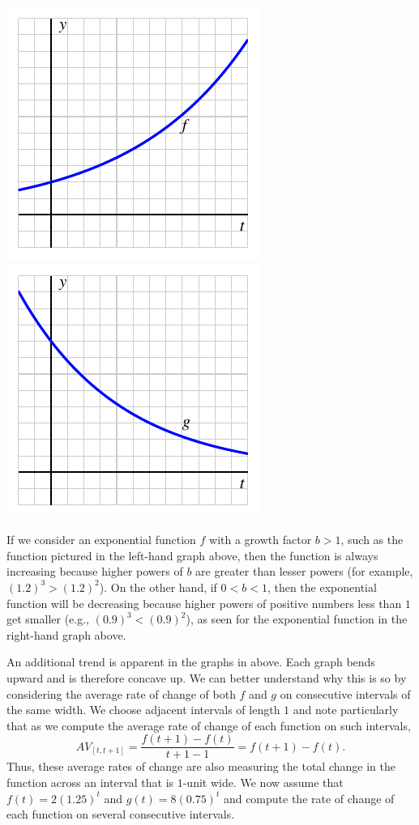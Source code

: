 \documentclass[nooutcomes]{ximera}
\begin{document}
\begin{image}
\includegraphics{growth-incr-CCU}
\includegraphics{growth-decr-CCU}
\end{image}

If we consider an exponential function $f$ with a growth factor $b > 1$, such as the function pictured in the left-hand graph above, then the function is always increasing because higher powers of $b$ are greater than lesser powers (for example, $(1.2)^3 \gt (1.2)^2$).  On the other hand, if $0 \lt b \lt 1$, then the exponential function will be decreasing because higher powers of positive numbers less than $1$ get smaller (e.g., $(0.9)^3 \lt (0.9)^2$), as seen for the exponential function in the right-hand graph above.

An additional trend is apparent in the graphs in above.  Each graph bends upward and is therefore concave up.  We can better understand why this is so by considering the average rate of change of both $f$ and $g$ on consecutive intervals of the same width.  We choose adjacent intervals of length $1$ and note particularly that as we compute the average rate of change of each function on such intervals,%
\begin{equation*}
AV_{[t,t+1]} = \frac{f(t+1) - f(t)}{t+1-1} = f(t+1) - f(t)\text{.}
\end{equation*}
Thus, these average rates of change are also measuring the total change in the function across an interval that is $1$-unit wide. We now assume that $f(t) = 2 (1.25)^t$ and $g(t) = 8(0.75)^t$ and compute the rate of change of each function on several consecutive intervals.
\end{document}
